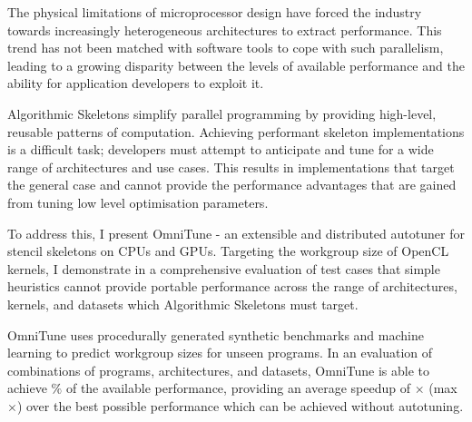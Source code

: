 The physical limitations of microprocessor design have forced the
industry towards increasingly heterogeneous architectures to extract
performance. This trend has not been matched with software tools to
cope with such parallelism, leading to a growing disparity between the
levels of available performance and the ability for application
developers to exploit it.

Algorithmic Skeletons simplify parallel programming by providing
high-level, reusable patterns of computation. Achieving performant
skeleton implementations is a difficult task; developers must attempt
to anticipate and tune for a wide range of architectures and use
cases. This results in implementations that target the general case
and cannot provide the performance advantages that are gained from
tuning low level optimisation parameters.

To address this, I present OmniTune - an extensible and distributed
autotuner for stencil skeletons on CPUs and GPUs. Targeting the
workgroup size of OpenCL kernels, I demonstrate in a comprehensive
evaluation of  test cases that simple
heuristics cannot provide portable performance across the range of
architectures, kernels, and datasets which Algorithmic Skeletons must
target.

OmniTune uses procedurally generated synthetic benchmarks and machine
learning to predict workgroup sizes for unseen programs. In an
evaluation of  combinations of programs,
architectures, and datasets, OmniTune is able to achieve
$\%$ of the available
performance, providing an average speedup of
$\times$ (max
$\times$) over the best
possible performance which can be achieved without autotuning.



